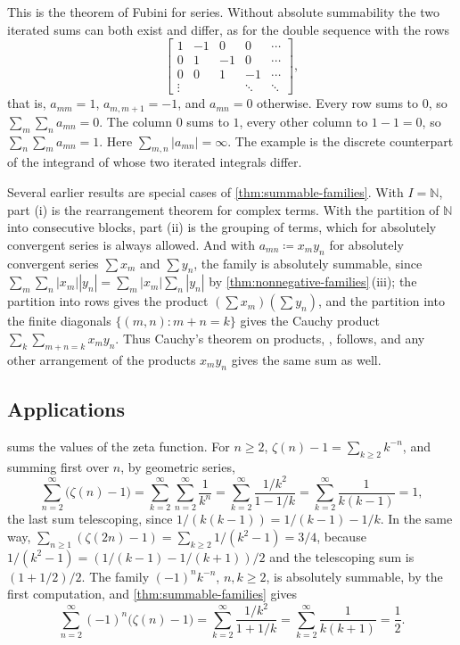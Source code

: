 This is the theorem of Fubini for series. Without absolute summability the two iterated sums can both exist and differ, as for the double sequence with the rows
\[
\begin{bmatrix}
1 & -1 & 0 & 0 & \cdots\\
0 & 1 & -1 & 0 & \cdots\\
0 & 0 & 1 & -1 & \cdots\\
\vdots & & & \ddots & \ddots
\end{bmatrix},
\]
that is, $a_{mm}=1$, $a_{m,m+1}=-1$, and $a_{mn}=0$ otherwise. Every row sums to $0$, so $\sum_m\sum_na_{mn}=0$. The column $0$ sums to $1$, every other column to $1-1=0$, so $\sum_n\sum_ma_{mn}=1$. Here $\sum_{m,n}|a_{mn}|=\infty$. The example is the discrete counterpart of the integrand of  whose two iterated integrals differ.

Several earlier results are special cases of \cref{thm:summable-families}. With $I=\mathbb N$, part (i) is the rearrangement theorem  for complex terms. With the partition of $\mathbb N$ into consecutive blocks, part (ii) is the grouping of terms, which for absolutely convergent series is always allowed. And with $a_{mn}\coloneqq x_my_n$ for absolutely convergent series $\sum x_m$ and $\sum y_n$, the family is absolutely summable, since $\sum_m\sum_n|x_m||y_n|=\sum_m|x_m|\sum_n|y_n|$ by \cref{thm:nonnegative-families}\,(iii); the partition into rows gives the product $(\sum x_m)(\sum y_n)$, and the partition into the finite diagonals $\{(m,n): m+n=k\}$ gives the Cauchy product $\sum_k\sum_{m+n=k}x_my_n$. Thus Cauchy's theorem on products, , follows, and any other arrangement of the products $x_my_n$ gives the same sum as well.

\subsection{Applications}

 sums the values of the zeta function. For $n\ge2$, $\zeta(n)-1=\sum_{k\ge2}k^{-n}$, and summing first over $n$, by geometric series,
\[
\sum_{n=2}^\infty\bigl(\zeta(n)-1\bigr)=\sum_{k=2}^\infty\sum_{n=2}^\infty\frac1{k^n}=\sum_{k=2}^\infty\frac{1/k^2}{1-1/k}=\sum_{k=2}^\infty\frac1{k(k-1)}=1 ,
\]
the last sum telescoping, since $1/(k(k-1))=1/(k-1)-1/k$. In the same way, $\sum_{n\ge1}(\zeta(2n)-1)=\sum_{k\ge2}1/(k^2-1)=3/4$, because $1/(k^2-1)=(1/(k-1)-1/(k+1))/2$ and the telescoping sum is $(1+1/2)/2$. The family $(-1)^nk^{-n}$, $n,k\ge2$, is absolutely summable, by the first computation, and \cref{thm:summable-families} gives
\[
\sum_{n=2}^\infty(-1)^n\bigl(\zeta(n)-1\bigr)=\sum_{k=2}^\infty\frac{1/k^2}{1+1/k}=\sum_{k=2}^\infty\frac1{k(k+1)}=\frac12 .
\]

